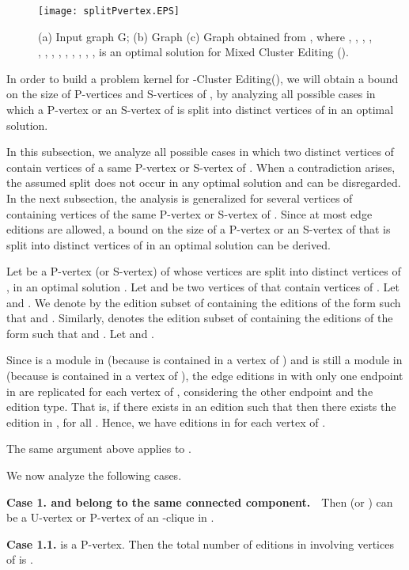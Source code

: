 \documentclass[12pt]{article}
\begin{document}
\begin{figure}[htb]
\centering
\texttt{[image: splitPvertex.EPS]}
\caption{\label{splitPvertex}(a) Input graph G; (b) Graph  (c) Graph 
obtained from , where , , , , ,
, , , , , , , , 
is an optimal solution for {\sc Mixed Cluster Editing} ().}
\end{figure}


In order to build a problem kernel for {\sc -Cluster Editing}(),
we will obtain a bound on the size of P-vertices and S-vertices of
, by analyzing all possible cases
in which a P-vertex or an S-vertex of  is split into distinct vertices
of  in an optimal solution.

In this subsection, we analyze all possible cases in which two distinct vertices of  contain
vertices of a same P-vertex or S-vertex of .
When a contradiction arises, the assumed split
does not occur in any optimal solution and can be disregarded.
In the next subsection, the analysis is generalized for several
vertices of  containing vertices of the same P-vertex or
S-vertex of . Since at most  edge editions are
allowed, a bound on the size of a P-vertex or an S-vertex of 
that is split into distinct vertices of  in an optimal solution can be derived.


Let  be a P-vertex (or S-vertex) of  whose
vertices are split into distinct vertices of , in an
optimal solution . Let  and  be two vertices of
 that contain vertices of . Let 
and . We denote by  the edition subset of
 containing the editions of the form  such that  and . Similarly,  denotes the edition subset of  containing the editions of the form 
such that  and . Let  and .

Since  is a module in  (because  is contained in a vertex of )
and is still a module in  (because  is contained in a vertex of ),
the edge editions in  with only one endpoint in  are
replicated for each vertex of , considering the other endpoint and the edition type.
That is, if there exists in  an edition  such that
 then there exists the edition  in ,
for all . Hence, we have  editions in
 for each vertex of .

The same argument above applies to .

We now analyze the following cases.

\textbf{Case 1.  and  belong to the same connected
component.}\ \ Then  (or ) can be a U-vertex or
P-vertex of an -clique in .

\textbf{Case 1.1.}  is a P-vertex. Then the total number of
editions in  involving vertices of  is
.
\end{document}
